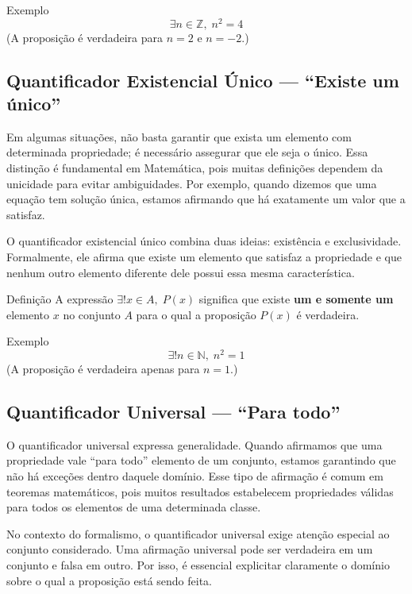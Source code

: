 \documentclass[12pt,a4paper,openright]{book}
\begin{document}
\begin{block}{Exemplo}
\[
\exists n \in \mathbb{Z},\; n^2 = 4
\]
(A proposição é verdadeira para \(n = 2\) e \(n = -2\).)
\end{block}



\subsection{Quantificador Existencial Único — “Existe um único”}

Em algumas situações, não basta garantir que exista um elemento com determinada propriedade; é necessário assegurar que ele seja o único. Essa distinção é fundamental em Matemática, pois muitas definições dependem da unicidade para evitar ambiguidades. Por exemplo, quando dizemos que uma equação tem solução única, estamos afirmando que há exatamente um valor que a satisfaz.

O quantificador existencial único combina duas ideias: existência e exclusividade. Formalmente, ele afirma que existe um elemento que satisfaz a propriedade e que nenhum outro elemento diferente dele possui essa mesma característica.

\begin{block}{Definição}
A expressão \(\exists! x \in A,\; P(x)\) significa que existe \textbf{um e somente um} elemento \(x\) no conjunto \(A\) para o qual a proposição \(P(x)\) é verdadeira.
\end{block}

\begin{block}{Exemplo}
\[
\exists! n \in \mathbb{N},\; n^2 = 1
\]
(A proposição é verdadeira apenas para \(n = 1\).)
\end{block}



\subsection{Quantificador Universal — “Para todo”}

O quantificador universal expressa generalidade. Quando afirmamos que uma propriedade vale “para todo” elemento de um conjunto, estamos garantindo que não há exceções dentro daquele domínio. Esse tipo de afirmação é comum em teoremas matemáticos, pois muitos resultados estabelecem propriedades válidas para todos os elementos de uma determinada classe.

No contexto do formalismo, o quantificador universal exige atenção especial ao conjunto considerado. Uma afirmação universal pode ser verdadeira em um conjunto e falsa em outro. Por isso, é essencial explicitar claramente o domínio sobre o qual a proposição está sendo feita.
\end{document}
